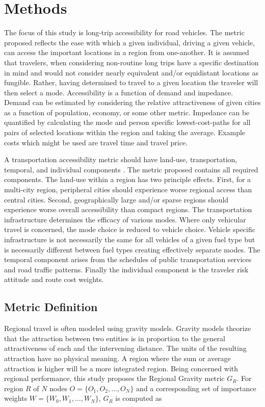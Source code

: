 \section*{Methods}

The focus of this study is long-trip accessibility for road vehicles. The metric proposed reflects the ease with which a given individual, driving a given vehicle, can access the important locations in a region from one-another. It is assumed that travelers, when considering non-routine long trips have a specific destination in mind and would not consider nearly equivalent and/or equidistant locations as fungible. Rather, having determined to travel to a given location the traveler will then select a mode. Accessibility is a function of demand and impedance. Demand can be estimated by considering the relative attractiveness of given cities as a function of population, economy, or some other metric. Impedance can be quantified by calculating the mode and person specific lowest-cost-paths for all pairs of selected locations within the region and taking the average. Example costs which might be used are travel time and travel price.

A transportation accessibility metric should have land-use, transportation, temporal, and individual components \cite{Karst_2003}. The metric proposed contains all required components. The land-use within a region has two principle effects. First, for a multi-city region, peripheral cities should experience worse regional access than central cities. Second, geographically large and/or sparse regions should experience worse overall accessibility than compact regions. The transportation infrastructure determines the efficacy of various modes. Where only vehicular travel is concerned, the mode choice is reduced to vehicle choice. Vehicle specific infrastructure is not necessarily the same for all vehicles of a given fuel type but is necessarily different between fuel types creating effectively separate modes. The temporal component arises from the schedules of public transportation services and road traffic patterns. Finally the individual component is the traveler risk attitude and route cost weights.

\subsection*{Metric Definition}

Regional travel is often modeled using gravity models. Gravity models theorize that the attraction between two entities is in proportion to the general attractiveness of each and the intervening distance. The units of the resulting attraction have no physical meaning. A region where the sum or average attraction is higher will be a more integrated region. Being concerned with regional performance, this study proposes the Regional Gravity metric $G_R$. For region $R$ of $N$ nodes $O = \{O_1, O_2, \dots, O_N\}$ and a corresponding set of importance weights $W = \{W_0, W_1, \dots, W_N\}$, $G_R$ is computed as

